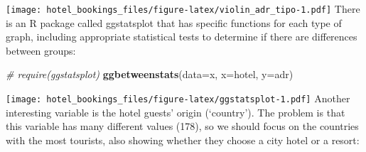 \documentclass[
]{article}
\newenvironment{Shaded}{\begin{snugshade}}{\end{snugshade}}
\newcommand{\AttributeTok}[1]{\textcolor[rgb]{0.13,0.29,0.53}{#1}}
\newcommand{\CommentTok}[1]{\textcolor[rgb]{0.56,0.35,0.01}{\textit{#1}}}
\newcommand{\DecValTok}[1]{\textcolor[rgb]{0.00,0.00,0.81}{#1}}
\newcommand{\FloatTok}[1]{\textcolor[rgb]{0.00,0.00,0.81}{#1}}
\newcommand{\FunctionTok}[1]{\textcolor[rgb]{0.13,0.29,0.53}{\textbf{#1}}}
\newcommand{\NormalTok}[1]{#1}
\newcommand{\OtherTok}[1]{\textcolor[rgb]{0.56,0.35,0.01}{#1}}
\newcommand{\SpecialCharTok}[1]{\textcolor[rgb]{0.81,0.36,0.00}{\textbf{#1}}}
\newcommand{\StringTok}[1]{\textcolor[rgb]{0.31,0.60,0.02}{#1}}
\begin{document}
\texttt{[image: hotel\_bookings\_files/figure-latex/violin\_adr\_tipo-1.pdf]}
There is an R package called ggstatsplot that has specific functions for
each type of graph, including appropriate statistical tests to determine
if there are differences between groups:

\begin{Shaded}
\begin{Highlighting}[]
\CommentTok{\# require(ggstatsplot)}
\FunctionTok{ggbetweenstats}\NormalTok{(}\AttributeTok{data=}\NormalTok{x, }\AttributeTok{x=}\NormalTok{hotel, }\AttributeTok{y=}\NormalTok{adr)}
\end{Highlighting}
\end{Shaded}

\texttt{[image: hotel\_bookings\_files/figure-latex/ggstatsplot-1.pdf]}
Another interesting variable is the hotel guests' origin (`country').
The problem is that this variable has many different values (178), so we
should focus on the countries with the most tourists, also showing
whether they choose a city hotel or a resort:

\begin{Shaded}
\end{Shaded}
\end{document}
